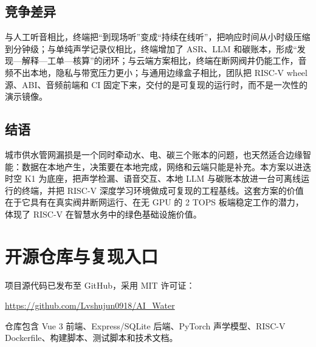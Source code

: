 \documentclass[lang=cn,11pt,scheme=chinese,chinesefont=nofont,color=green]{elegantbook}
\begin{document}
\section{竞争差异}

与人工听音相比，终端把“到现场听”变成“持续在线听”，把响应时间从小时级压缩到分钟级；与单纯声学记录仪相比，终端增加了 ASR、LLM 和碳账本，形成“发现—解释—工单—核算”的闭环；与云端方案相比，终端在断网阀井仍能工作，音频不出本地，隐私与带宽压力更小；与通用边缘盒子相比，团队把 RISC-V wheel 源、ABI、音频前端和 CI 固定下来，交付的是可复现的运行时，而不是一次性的演示镜像。

\section{结语}
\label{sec:conclusion}

城市供水管网漏损是一个同时牵动水、电、碳三个账本的问题，也天然适合边缘智能：数据在本地产生，决策要在本地完成，网络和云端只能是补充。本方案以进迭时空 K1 为底座，把声学检漏、语音交互、本地 LLM 与碳账本放进一台可离线运行的终端，并把 RISC-V 深度学习环境做成可复现的工程基线。这套方案的价值在于它具有在真实阀井断网运行、在无 GPU 的 2 TOPS 板端稳定工作的潜力，体现了 RISC-V 在智慧水务中的绿色基础设施价值。

\appendix

\chapter{开源仓库与复现入口}
\label{app:repo}

项目源代码已发布至 GitHub，采用 MIT 许可证：

\begin{center}
\large\url{https://github.com/Lvshujun0918/AI_Water}
\end{center}

仓库包含 Vue 3 前端、Express/SQLite 后端、PyTorch 声学模型、RISC-V Dockerfile、构建脚本、测试脚本和技术文档。

\printbibliography[title=参考资料]
\end{document}
